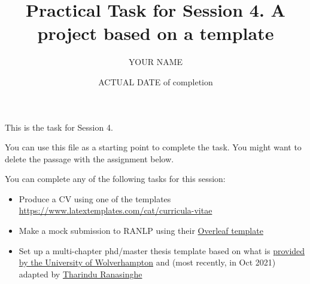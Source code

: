 \documentclass[a4paper,11pt]{article}
\title{Practical Task for Session 4. A project based on a template}
\author{YOUR NAME}
\date{ACTUAL DATE of completion}
\begin{document}
	
	\maketitle

This is the task for Session 4. 

\bigskip

You can use this file as a starting point to complete the task. You might want to delete the passage with the assignment below.

\bigskip

You can complete any of the following tasks for this session:

	\begin{itemize}
		\item Produce a CV using one of the templates \href{here}{https://www.latextemplates.com/cat/curricula-vitae}
		\item Make a mock submission to RANLP using their \href{https://www.overleaf.com/latex/templates/instructions-for-ranlp-2021-proceedings/snyphxfdqcpz}{Overleaf template}
		\item Set up a multi-chapter phd/master thesis template based on what is \href{https://github.com/snim2/phdtemplate}{provided by the University of Wolverhampton} and (most recently, in Oct 2021) adapted by \href{https://github.com/TharinduDR/Thesis/}{Tharindu Ranasinghe}
	\end{itemize}
	
\end{document}
